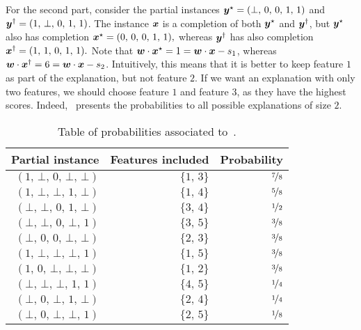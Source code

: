 \begin{example}
For the second part, consider the partial instances ${\bm{y}}^{\star} = (\bot, \, 0, \, 0, \, 1, \, 1)$ and ${\bm{y}}^{\dagger} = (1, \, \bot, \, 0, \, 1, \, 1)$. The instance ${\bm{x}}$ is a completion of both ${\bm{y}}^{\star}$ and ${\bm{y}}^{\dagger}$, but ${\bm{y}}^{\star}$ also has completion 
\(
    {\bm{x}}^{\star} = (0, \, 0, \, 0, \, 1, \, 1),
\)
whereas ${\bm{y}}^{\dagger}$ has also completion 
\(
    {\bm{x}}^{\dagger} = (1, \, 1, \, 0, \, 1, \, 1).
\)
Note that ${\bm{w}} \cdot  {\bm{x}}^{\star} = 1 = {\bm{w}} \cdot {\bm{x}} - s_1$, whereas ${\bm{w}} \cdot  {\bm{x}}^{\dagger} = 6 = {\bm{w}} \cdot {\bm{x}} - s_2$. Intuitively, this means that it is better to keep feature $1$ as part of the explanation, but not feature $2$. If we want an explanation with only two features, we should choose feature $1$ and feature $3$, as they have the highest scores. Indeed,~ presents the probabilities to all possible explanations of size $2$.
\begin{table}
    \caption{Table of probabilities associated to~.}\label{table:ex-greedy2}
    \centering
    \begin{tabular}{rrr}
        \toprule
        Partial instance & Features included & Probability\\ \midrule 
    $(1, \,\bot, \,0, \,\bot, \,\bot)$ & $\{1, \,3\}$ & $\nicefrac{ 7 }{ 8 }$\\
    $(1, \,\bot, \,\bot, \,1, \,\bot)$ & $\{1, \,4\}$ & $\nicefrac{ 5 }{ 8 }$\\
    $(\bot, \,\bot, \,0, \,1, \,\bot)$ & $\{3, \,4\}$ & $\nicefrac{ 1 }{ 2 }$\\
    $(\bot, \,\bot, \,0, \,\bot, \,1)$ & $\{3, \,5\}$ & $\nicefrac{ 3 }{ 8 }$\\
    $(\bot, \,0, \,0, \,\bot, \,\bot)$ & $\{2, \,3\}$ & $\nicefrac{ 3 }{ 8 }$\\
    $(1, \,\bot, \,\bot, \,\bot, \,1)$ & $\{1, \,5\}$ & $\nicefrac{ 3 }{ 8 }$\\
    $(1, \,0, \,\bot, \,\bot, \,\bot)$ & $\{1, \,2\}$ & $\nicefrac{ 3 }{ 8 }$\\
    $(\bot, \,\bot, \,\bot, \,1, \,1)$ & $\{4, \,5\}$ & $\nicefrac{ 1 }{ 4 }$\\
    $(\bot, \,0, \,\bot, \,1, \,\bot)$ & $\{2, \,4\}$ & $\nicefrac{ 1 }{ 4 }$\\
    $(\bot, \,0, \,\bot, \,\bot, \,1)$ & $\{2, \,5\}$ & $\nicefrac{ 1 }{ 8 }$\\
        \bottomrule
    \end{tabular}
\end{table}
\begin{table}

\end{table}
\end{example}
